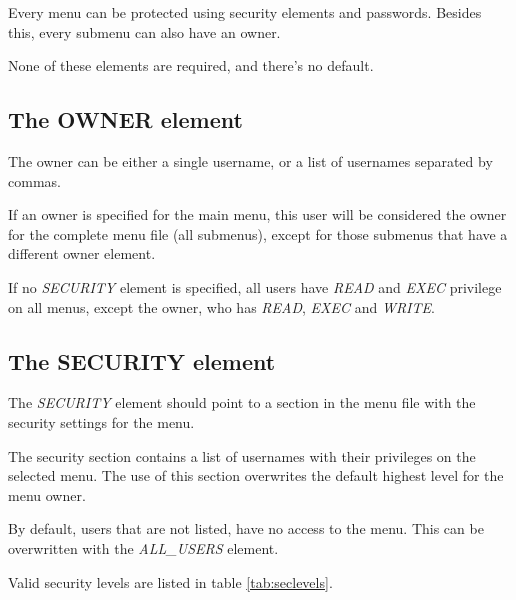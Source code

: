\documentclass[a4paper]{book}
\newcommand{\vs}{\vspace{3mm}}
\begin{document}
Every menu can be protected using security elements and passwords. Besides 
this, every submenu can also have an owner.

None of these elements are required, and there's no default.

\subsection{The OWNER element}
\label{subsubsec:mylabel31}

The owner can be either a single username, or a list of usernames separated 
by commas.

\vs

If an owner is specified for the main menu, 
this user will be considered the owner for the complete menu file (all 
submenus), except for those submenus that have a different owner element.

\vs

If no \textsl{SECURITY} element is specified, 
all users have \textsl{READ} and \textsl{EXEC} privilege on all menus, except the owner, who 
has \textsl{READ}, \textsl{EXEC} and \textsl{WRITE}.

\subsection{The SECURITY element}
\label{subsubsec:mylabel32}

The \textsl{SECURITY} element should point to a 
section in the menu file with the security settings for the menu.

\vs

The security section contains a list of usernames with their privileges on 
the selected menu. The use of this section overwrites the default highest 
level for the menu owner.

\vs

By default, users that are not listed, have no access to the menu. This can 
be overwritten with the \textsl{ALL{\_}USERS} element.

Valid security levels are listed in table \ref{tab:seclevels}.
\end{document}
